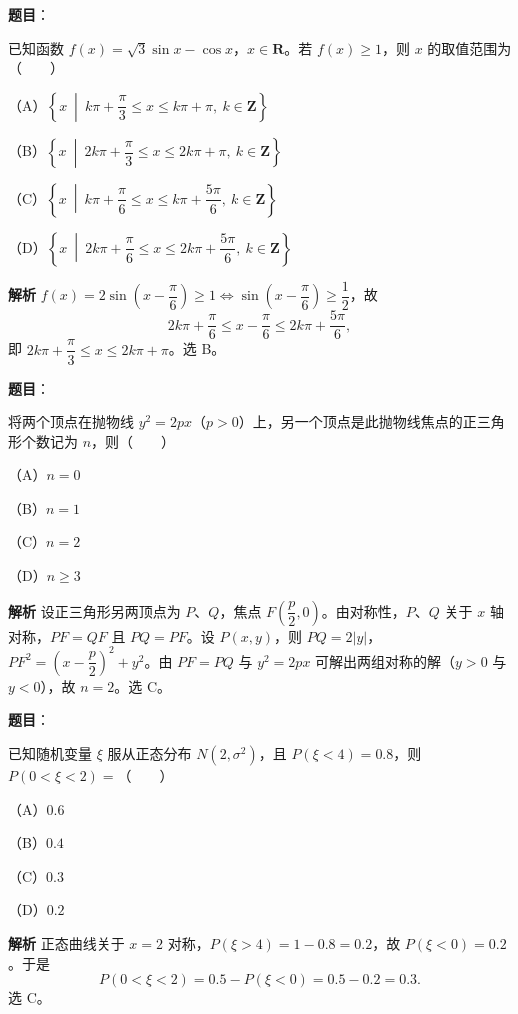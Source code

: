 \begin{answer}

\textbf{题目}：

已知函数 $f(x)=\sqrt3\sin x-\cos x$，$x\in\mathbf R$。若 $f(x)\geqslant1$，则 $x$ 的取值范围为\mbox{（　　）}

（A）$\left\{x\ \middle|\ k\pi+\dfrac\pi3\leqslant x\leqslant k\pi+\pi,\ k\in\mathbf Z\right\}$

（B）$\left\{x\ \middle|\ 2k\pi+\dfrac\pi3\leqslant x\leqslant2k\pi+\pi,\ k\in\mathbf Z\right\}$

（C）$\left\{x\ \middle|\ k\pi+\dfrac\pi6\leqslant x\leqslant k\pi+\dfrac{5\pi}6,\ k\in\mathbf Z\right\}$

（D）$\left\{x\ \middle|\ 2k\pi+\dfrac\pi6\leqslant x\leqslant2k\pi+\dfrac{5\pi}6,\ k\in\mathbf Z\right\}$

\textbf{解析}
$f(x)=2\sin\left(x-\dfrac\pi6\right)\geqslant1\iff\sin\left(x-\dfrac\pi6\right)\geqslant\dfrac12$，故
\nopagebreak[4]
\[2k\pi+\frac\pi6\leqslant x-\frac\pi6\leqslant2k\pi+\frac{5\pi}6,\]
即 $2k\pi+\dfrac\pi3\leqslant x\leqslant2k\pi+\pi$。选 B。


\end{answer}
\begin{answer}

\textbf{题目}：

将两个顶点在抛物线 $y^2=2px$（$p>0$）上，另一个顶点是此抛物线焦点的正三角形个数记为 $n$，则\mbox{（　　）}

（A）$n=0$

（B）$n=1$

（C）$n=2$

（D）$n\geqslant3$

\textbf{解析}
设正三角形另两顶点为 $P$、$Q$，焦点 $F\left(\dfrac p2,0\right)$。由对称性，$P$、$Q$ 关于 $x$ 轴对称，$PF=QF$ 且 $PQ=PF$。设 $P(x,y)$，则 $PQ=2|y|$，$PF^2=\left(x-\dfrac p2\right)^2+y^2$。由 $PF=PQ$ 与 $y^2=2px$ 可解出两组对称的解（$y>0$ 与 $y<0$），故 $n=2$。选 C。


\end{answer}
\begin{answer}

\textbf{题目}：

已知随机变量 $\xi$ 服从正态分布 $N(2,\sigma^2)$，且 $P(\xi<4)=0.8$，则 $P(0<\xi<2)=$\mbox{（　　）}

（A）$0.6$

（B）$0.4$

（C）$0.3$

（D）$0.2$

\textbf{解析}
正态曲线关于 $x=2$ 对称，$P(\xi>4)=1-0.8=0.2$，故 $P(\xi<0)=0.2$。于是
\nopagebreak[4]
\[P(0<\xi<2)=0.5-P(\xi<0)=0.5-0.2=0.3.\]
选 C。


\end{answer}
